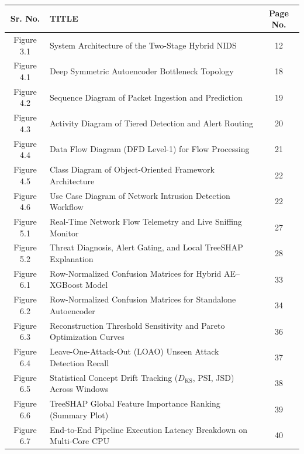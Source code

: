 \documentclass[12pt,a4paper]{report}
\begin{document}
\noindent
\begin{tabularx}{\textwidth}{|c|X|c|}
\hline
\textbf{Sr. No.} & \textbf{\centering TITLE} & \textbf{Page No.} \\
\hline
Figure 3.1 & System Architecture of the Two-Stage Hybrid NIDS & 12 \\
\hline
Figure 4.1 & Deep Symmetric Autoencoder Bottleneck Topology & 18 \\
\hline
Figure 4.2 & Sequence Diagram of Packet Ingestion and Prediction & 19 \\
\hline
Figure 4.3 & Activity Diagram of Tiered Detection and Alert Routing & 20 \\
\hline
Figure 4.4 & Data Flow Diagram (DFD Level-1) for Flow Processing & 21 \\
\hline
Figure 4.5 & Class Diagram of Object-Oriented Framework Architecture & 22 \\
\hline
Figure 4.6 & Use Case Diagram of Network Intrusion Detection Workflow & 22 \\
\hline
Figure 5.1 & Real-Time Network Flow Telemetry and Live Sniffing Monitor & 27 \\
\hline
Figure 5.2 & Threat Diagnosis, Alert Gating, and Local TreeSHAP Explanation & 28 \\
\hline
Figure 6.1 & Row-Normalized Confusion Matrices for Hybrid AE--XGBoost Model & 33 \\
\hline
Figure 6.2 & Row-Normalized Confusion Matrices for Standalone Autoencoder & 34 \\
\hline
Figure 6.3 & Reconstruction Threshold Sensitivity and Pareto Optimization Curves & 36 \\
\hline
Figure 6.4 & Leave-One-Attack-Out (LOAO) Unseen Attack Detection Recall & 37 \\
\hline
Figure 6.5 & Statistical Concept Drift Tracking ($D_{\text{KS}}$, PSI, JSD) Across Windows & 38 \\
\hline
Figure 6.6 & TreeSHAP Global Feature Importance Ranking (Summary Plot) & 39 \\
\hline
Figure 6.7 & End-to-End Pipeline Execution Latency Breakdown on Multi-Core CPU & 40 \\
\hline
\end{tabularx}

\clearpage
{}
\setcounter{page}{8}
\thispagestyle{plain}
\end{document}
